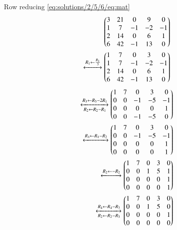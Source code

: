 Row reducing \eqref{eq:solutions/2/5/6/eq:mat}
\begin{align}
\begin{pmatrix}3&21&0&9&0\\1&7&-1&-2&-1\\2&14&0&6&1\\6&42&-1&13&0\end{pmatrix} \nonumber\\
\xleftrightarrow[]{R_1\leftarrow\frac{R_1}{3}}
\begin{pmatrix}1&7&0&3&0\\1&7&-1&-2&-1\\2&14&0&6&1\\6&42&-1&13&0\end{pmatrix} \nonumber
\end{align}
\begin{align}
\xleftrightarrow[R_2\leftarrow R_2-R_1]{R_3\leftarrow R_3-2R_1}\begin{pmatrix}1&7&0&3&0\\0&0&-1&-5&-1\\0&0&0&0&1\\0&0&-1&-5&0\end{pmatrix}  \nonumber\\
\xleftrightarrow[]{R_4\leftarrow R_4-R_2}\begin{pmatrix}1&7&0&3&0\\0&0&-1&-5&-1\\0&0&0&0&1\\0&0&0&0&1\end{pmatrix}  \nonumber\\
\xleftrightarrow[]{R_2\leftarrow -R_2}\begin{pmatrix}1&7&0&3&0\\0&0&1&5&1\\0&0&0&0&1\\0&0&0&0&1\end{pmatrix}  \nonumber\\
\xleftrightarrow[R_2\leftarrow R_2-R_3]{R_4\leftarrow R_4-R_3}\begin{pmatrix}1&7&0&3&0\\0&0&1&5&0\\0&0&0&0&1\\0&0&0&0&0\end{pmatrix} \label{eq:solutions/2/5/6/eq:rref}
\end{align}
